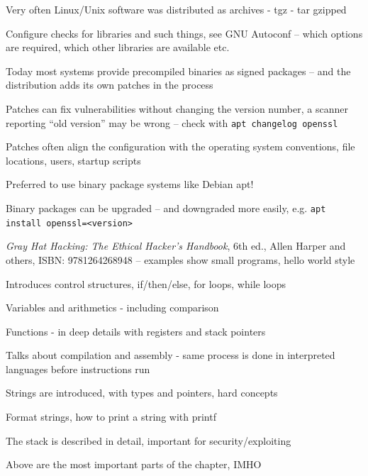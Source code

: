 \documentclass[Screen16to9,17pt]{foils}
\begin{document}

\begin{list2}
\item Very often Linux/Unix software was distributed as archives - tgz - tar gzipped
\item Configure checks for libraries and such things, see GNU Autoconf -- which options are required, which other libraries are available etc.
\item Today most systems provide precompiled binaries as signed packages -- and the distribution adds its own patches in the process
\item Patches can fix vulnerabilities without changing the version number, a scanner reporting ``old version'' may be wrong -- check with \verb+apt changelog openssl+
\item Patches often align the configuration with the operating system conventions, file locations, users, startup scripts
\item Preferred to use binary package systems like Debian apt!
\item Binary packages can be upgraded -- and downgraded more easily, e.g. \verb+apt install openssl=<version>+
\end{list2}






\emph{Gray Hat Hacking: The Ethical Hacker's Handbook}, 6th ed., Allen Harper and others, ISBN: 9781264268948 -- examples show small programs, hello world style
\begin{list2}
\item Introduces control structures, if/then/else, for loops, while loops
\item Variables and arithmetics - including comparison
\item Functions - in deep details with registers and stack pointers
\item Talks about compilation and assembly - same process is done in interpreted languages before instructions run
\item Strings are introduced, with types and pointers, hard concepts
\item Format strings, how to print a string with printf
\item The stack is described in detail, important for security/exploiting
\item Above are the most important parts of the chapter, IMHO
\end{list2}
\end{document}
